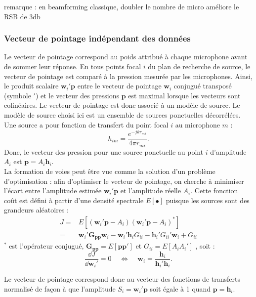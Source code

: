 remarque : en beamforming classique, doubler le nombre de micro améliore le RSB de 3db

\subsubsection{Vecteur de pointage indépendant des données}

Le vecteur de pointage correspond au poids attribué à chaque microphone avant de sommer leur réponse.  En tous points focal $i$ du plan de recherche de source, le vecteur de pointage est comparé à la pression mesurée par les microphones. Ainsi, le produit scalaire $\bm{w}_i'\bm{p}$ entre le vecteur de pointage $\bm{w}_i$ conjugué transposé (symbole $'$) et le vecteur des pressions $\bm{p}$ est maximal lorsque les vecteurs sont colinéaires. Le vecteur de pointage est donc associé à un modèle de source. Le modèle de source choisi ici est un ensemble de sources ponctuelles décorrélées. Une source a pour fonction de transfert du point focal $i$ au microphone $m$ : 
\begin{equation}
	h_{im}=\frac{e^{-jkr_{mi}}}{4\pi r_{mi}}.
\end{equation}
Donc, le vecteur des pression pour une source ponctuelle au point $i$ d'amplitude $A_i$ est $\bm{p}=A_i\bm{h}_i$.\\

La formation de voies peut être vue comme la solution d'un problème d'optimisation : afin d'optimiser le vecteur de pointage, on cherche à minimiser l'écart entre l'amplitude estimée $\bm{w}_i'\bm{p}$ et l'amplitude réelle $A_i$. Cette fonction coût est défini à partir d'une densité spectrale $E[\bullet]$ puisque les sources sont des grandeurs aléatoires :
\begin{eqnarray}
	J=&E\left[(\bm{w}_i'\bm{p}-A_i)(\bm{w}_i'\bm{p}-A_i)^*\right]\\
	 =& \bm{w}_i'\bm{G_{pp}}\bm{w}_i-\bm{w}_i'\bm{h}_iG_{ii}-\bm{h}_i'G_{ii}'\bm{w}_i + G_{ii}
\end{eqnarray}
$^*$ est l'opérateur conjugué, $\bm{G_{pp}}=E[\bm{p}\bm{p}']$ et $G_{ii}=E[A_iA_i']$ , soit : 
\begin{equation}
	\frac{\dd J}{\dd \bm{w}_i'}=0 ~~~~~\Leftrightarrow ~~~~~ \bm{w}_i=\frac{\bm{h}_i}{\bm{h}_i'\bm{h}_i}.
\end{equation}

Le vecteur de pointage correspond donc au vecteur des fonctions de transferts normalisé de façon à que l'amplitude $S_i=\bm{w}_i'\bm{p}$ soit égale à 1 quand $\bm{p}=\bm{h}_i$.\\

